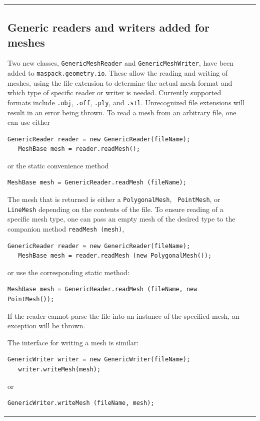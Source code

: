 \documentclass{article}
\begin{document}
\begin{tabular}{ll}
\subsection*{Generic readers and writers added for meshes}

Two new classes, {\tt GenericMeshReader} and {\tt GenericMeshWriter},
have been added to {\tt maspack.geometry.io}. These allow the reading
and writing of meshes, using the file extension to determine the
actual mesh format and which type of specific reader or writer is
needed. Currently supported formats include {\tt .obj}, {\tt .off},
{\tt .ply}, and {\tt .stl}. Unrecognized file extensions will result
in an error being thrown. To read a mesh from an arbitrary file, one
can use either
\begin{lstlisting}[]
   GenericReader reader = new GenericReader(fileName);
   MeshBase mesh = reader.readMesh();
\end{lstlisting}
or the static convenience method
\begin{lstlisting}[]
   MeshBase mesh = GenericReader.readMesh (fileName);
\end{lstlisting}
The mesh that is returned is either a {\tt PolygonalMesh}, {\tt
PointMesh}, or {\tt LineMesh} depending on the contents of the
file. To ensure reading of a specific mesh type, one can pass
an empty mesh of the desired type to the companion method
{\tt readMesh (mesh)},
\begin{lstlisting}[]
   GenericReader reader = new GenericReader(fileName);
   MeshBase mesh = reader.readMesh (new PolygonalMesh());
\end{lstlisting}
or use the corresponding static method:
\begin{lstlisting}[]
   MeshBase mesh = GenericReader.readMesh (fileName, new PointMesh());
\end{lstlisting}
If the reader cannot parse the file into an instance of the specified
mesh, an exception will be thrown.

The interface for writing a mesh is similar:
\begin{lstlisting}[]
   GenericWriter writer = new GenericWriter(fileName);
   writer.writeMesh(mesh);
\end{lstlisting}
or 
\begin{lstlisting}[]
   GenericWriter.writeMesh (fileName, mesh);
\end{lstlisting}


\end{tabular}
\end{document}
